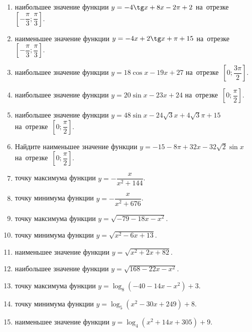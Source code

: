 \documentclass[a4paper,10pt]{article}
\begin{document}
\begin{enumerate}
\item {} наибольшее значение функции $y=-4\tg x +8x-2\pi +2$ на~отрезке~$\left[-\dfrac{\pi}{3};\dfrac{\pi}{3}\right]$.

\item {} наименьшее значение функции $y=-4x +2\tg x+\pi+15$ на~отрезке~$\left[-\dfrac{\pi}{3};\dfrac{\pi}{3}\right]$.

\item {} наибольшее значение функции $y=18\cos x-19x+27$ на~отрезке~$\left[0;\dfrac{3\pi}{2}\right]$.

\item {} наибольшее значение функции $y=20\sin x-23x+24$ на~отрезке~$\left[0;\dfrac{\pi}{2}\right]$.

\item {} наибольшее значение функции $y=48\sin x-24\sqrt{3}x+4\sqrt{3}\pi +15$ на~отрезке~$\left[0;\dfrac{\pi}{2}\right]$.

\item Найдите наименьшее значение функции $y=-15-8\pi+32x-32\sqrt{2}\sin x$ на~отрезке~$\left[0;\dfrac{\pi}{2}\right]$.

\item {} точку максимума функции $y=-\dfrac{x}{ x^2 +144}$.

\item {} точку минимума функции $y=-\dfrac{x}{ x^2 +676}$.

\item {} точку максимума функции $y=\sqrt{-79-18x-x^2}$.

\item {} точку минимума функции $y=\sqrt{x^2-6x+13}$.

\item {} наименьшее значение функции $y=\sqrt{x^2+2x+82}$.

\item {} наибольшее значение функции $y=\sqrt{168-22x-x^2}$.

\item {} точку максимума функции $y=\log_8\left(-40-14x-x^2\right)+3$.

\item {} точку минимума функции $y=\log_5\left(x^2-30x+249\right)+8$.

\item {} наименьшее значение функции $y=\log_4\left(x^2+14x+305\right)+9$.


\end{enumerate}
\end{document}
